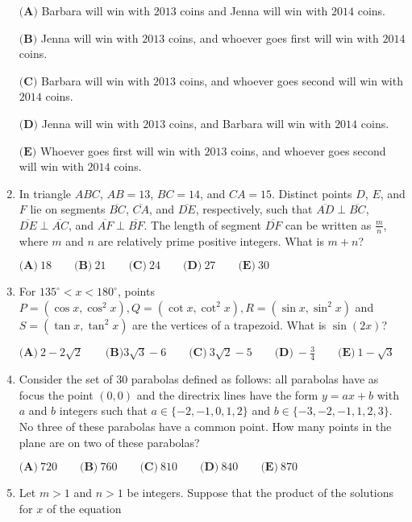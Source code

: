 \documentclass{article}
\begin{document}
\begin{enumerate}[label=\arabic*., itemsep=0.5em]
$ \textbf{(A)}$ Barbara will win with $2013$ coins and Jenna will win with $2014$ coins. 

$\textbf{(B)}$ Jenna will win with $2013$ coins, and whoever goes first will win with $2014$ coins. 

$\textbf{(C)}$ Barbara will win with $2013$ coins, and whoever goes second will win with $2014$ coins.

$\textbf{(D)}$ Jenna will win with $2013$ coins, and Barbara will win with $2014$ coins.

$\textbf{(E)}$ Whoever goes first will win with $2013$ coins, and whoever goes second will win with $2014$ coins.\par \vspace{0.5em}\item In triangle $ABC$, $AB=13$, $BC=14$, and $CA=15$. Distinct points $D$, $E$, and $F$ lie on segments $\overline{BC}$, $\overline{CA}$, and $\overline{DE}$, respectively, such that $\overline{AD}\perp\overline{BC}$, $\overline{DE}\perp\overline{AC}$, and $\overline{AF}\perp\overline{BF}$. The length of segment $\overline{DF}$ can be written as $\frac{m}{n}$, where $m$ and $n$ are relatively prime positive integers. What is $m+n$?

$ \textbf{(A)}\ 18\qquad\textbf{(B)}\ 21\qquad\textbf{(C)}\ 24\qquad\textbf{(D)}\ 27\qquad\textbf{(E)}\ 30 $\par \vspace{0.5em}\item For $135^\circ < x < 180^\circ$, points $P=(\cos x, \cos^2 x), Q=(\cot x, \cot^2 x), R=(\sin x, \sin^2 x)$ and $S =(\tan x, \tan^2 x)$ are the vertices of a trapezoid. What is $\sin(2x)$?

$ \textbf{(A)}\ 2-2\sqrt{2}\qquad\textbf{(B)} 3\sqrt{3}-6\qquad\textbf{(C)}\ 3\sqrt{2}-5\qquad\textbf{(D)}\ -\frac{3}{4}\qquad\textbf{(E)}\ 1-\sqrt{3}$\par \vspace{0.5em}\item Consider the set of $30$ parabolas defined as follows: all parabolas have as focus the point $(0,0)$ and the directrix lines have the form $y=ax+b$ with $a$ and $b$ integers such that $a\in \{-2,-1,0,1,2\}$ and $b\in \{-3,-2,-1,1,2,3\}$. No three of these parabolas have a common point. How many points in the plane are on two of these parabolas?

$ \textbf{(A)}\ 720\qquad\textbf{(B)}\ 760\qquad\textbf{(C)}\ 810\qquad\textbf{(D)}\ 840\qquad\textbf{(E)}\ 870 $\par \vspace{0.5em}\item Let $m>1$ and $n>1$ be integers. Suppose that the product of the solutions for $x$ of the equation


\end{enumerate}
\end{document}
